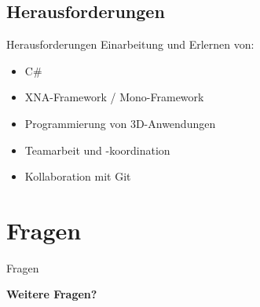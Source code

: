 \documentclass[18pt]{beamer}
\begin{document}
\subsection{Herausforderungen}
\begin{frame} {Herausforderungen}
Einarbeitung und Erlernen von:
\begin{itemize}
\item C\#
\item XNA-Framework / Mono-Framework
\item Programmierung von 3D-Anwendungen
\item Teamarbeit und -koordination
\item Kollaboration mit Git
\end{itemize}
\end{frame}


\section{Fragen}
\begin{frame}{Fragen}
\begin{center}
\Huge \textbf{Weitere Fragen?}
\end{center}
\end{frame}



%
%
\end{document}
